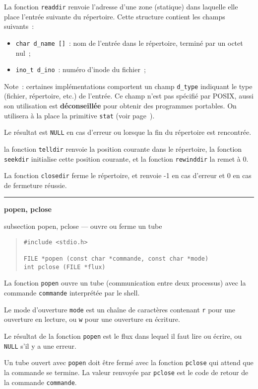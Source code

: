 \documentclass [twoside] {report}
\newcommand {\primitive} [1]
    {
	\phantomsection
	{\large \bf #1}
	\addcontentsline {toc} {subsection} {#1}
    }
\newcommand {\separation}
    {
	\vspace {5mm}
	\nopagebreak
	\hrule
    }
\begin{document}
La fonction {\tt readdir} renvoie l'adresse d'une zone (statique) dans
laquelle elle place l'entrée suivante du répertoire. Cette structure
contient les champs suivants~:

\begin {itemize}
    \item {\tt char d\_name []}~: nom de l'entrée dans le
	répertoire, terminé par un octet nul~;
    \item {\tt ino\_t d\_ino}~: numéro d'inode du fichier~;
\end {itemize}

Note~: certaines implémentations comportent un champ \texttt {d\_type}
indiquant le type (fichier, répertoire, etc.) de l'entrée. Ce champ
n'est pas spécifié par POSIX, aussi son utilisation est \textbf
{déconseillée} pour obtenir des programmes portables. On utilisera à
la place la primitive \texttt {stat} (voir page~\pageref {stat}).

Le résultat est {\tt NULL} en cas d'erreur ou lorsque la fin du
répertoire est rencontrée.

la fonction {\tt telldir} renvoie la position courante dans le
répertoire, la fonction {\tt seekdir} initialise cette position
courante, et la fonction {\tt rewinddir} la remet à 0.

La fonction {\tt closedir} ferme le répertoire, et renvoie -1 en cas
d'erreur et 0 en cas de fermeture réussie.


\separation
\primitive {popen, pclose} --- ouvre ou ferme un tube

\begin {quote}
\begin {verbatim}
#include <stdio.h>

FILE *popen (const char *commande, const char *mode)
int pclose (FILE *flux)
\end{verbatim}
\end {quote}

La fonction {\tt popen} ouvre un tube (communication entre
deux processus) avec la commande {\tt commande} interprétée par
le shell.

Le mode d'ouverture {\tt mode} est un chaîne de caractères
contenant {\tt r} pour une ouverture en lecture, ou {\tt w} pour
une ouverture en écriture.

Le résultat de la fonction {\tt popen} est le flux dans lequel
il faut lire ou écrire, ou {\tt NULL} s'il y a une erreur.

Un tube ouvert avec {\tt popen} doit être fermé avec la
fonction {\tt pclose} qui attend que la commande se termine. La
valeur renvoyée par {\tt pclose} est le code de retour de la
commande {\tt commande}.
\end{document}
